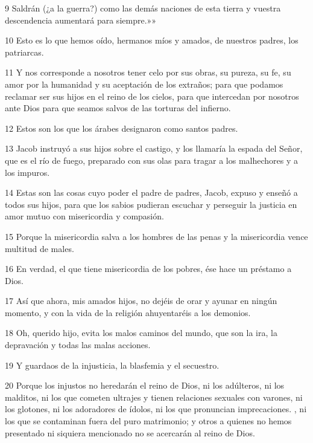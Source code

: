 \par 9 Saldrán (¿a la guerra?) como las demás naciones de esta tierra y vuestra descendencia aumentará para siempre.»»

\par 10 Esto es lo que hemos oído, hermanos míos y amados, de nuestros padres, los patriarcas.

\par 11 Y nos corresponde a nosotros tener celo por sus obras, su pureza, su fe, su amor por la humanidad y su aceptación de los extraños; para que podamos reclamar ser sus hijos en el reino de los cielos, para que intercedan por nosotros ante Dios para que seamos salvos de las torturas del infierno.

\par 12 Estos son los que los árabes designaron como santos padres.

\par 13 Jacob instruyó a sus hijos sobre el castigo, y los llamaría la espada del Señor, que es el río de fuego, preparado con sus olas para tragar a los malhechores y a los impuros.

\par 14 Estas son las cosas cuyo poder el padre de padres, Jacob, expuso y enseñó a todos sus hijos, para que los sabios pudieran escuchar y perseguir la justicia en amor mutuo con misericordia y compasión.

\par 15 Porque la misericordia salva a los hombres de las penas y la misericordia vence multitud de males.

\par 16 En verdad, el que tiene misericordia de los pobres, ése hace un préstamo a Dios.

\par 17 Así que ahora, mis amados hijos, no dejéis de orar y ayunar en ningún momento, y con la vida de la religión ahuyentaréis a los demonios.

\par 18 Oh, querido hijo, evita los malos caminos del mundo, que son la ira, la depravación y todas las malas acciones.

\par 19 Y guardaos de la injusticia, la blasfemia y el secuestro.

\par 20 Porque los injustos no heredarán el reino de Dios, ni los adúlteros, ni los malditos, ni los que cometen ultrajes y tienen relaciones sexuales con varones, ni los glotones, ni los adoradores de ídolos, ni los que pronuncian imprecaciones. , ni los que se contaminan fuera del puro matrimonio; y otros a quienes no hemos presentado ni siquiera mencionado no se acercarán al reino de Dios.

